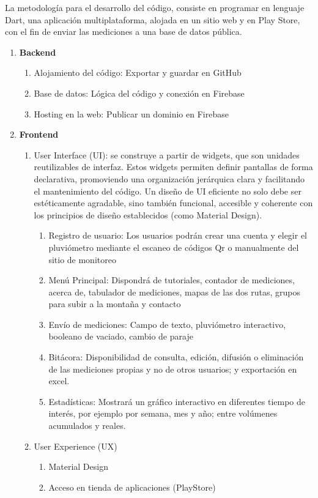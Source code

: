 La metodología para el desarrollo del código, consiste en programar en lenguaje Dart, una aplicación multiplataforma, alojada en un sitio web y en Play Store, con el fin de enviar las mediciones a una base de datos pública.


\begin{enumerate}
  \item \textbf{Backend}
   \begin{enumerate}
    \item Alojamiento del código: Exportar y guardar en GitHub
    \item Base de datos: Lógica del código y conexión en Firebase
    \item Hosting en la web: Publicar un dominio en Firebase
  \end{enumerate}
  \item \textbf{Frontend}
  \begin{enumerate}
    \item User Interface (UI): se construye a partir de widgets, que son unidades reutilizables de interfaz. Estos widgets permiten definir pantallas de forma declarativa, promoviendo una organización jerárquica clara y facilitando el mantenimiento del código. Un diseño de UI eficiente no solo debe ser estéticamente agradable, sino también funcional, accesible y coherente con los principios de diseño establecidos (como Material Design). 
    \begin{enumerate}
    \item Registro de usuario: Los usuarios podrán crear una cuenta y elegir el pluviómetro mediante el escaneo de códigos Qr o manualmente del sitio de monitoreo 
    \item Menú Principal: Dispondrá de tutoriales, contador de mediciones, acerca de, tabulador de mediciones, mapas de las dos rutas, grupos para subir a la montaña y contacto
    \item Envío de mediciones: Campo de texto, pluviómetro interactivo, booleano de vaciado, cambio de paraje
    \item Bitácora: Disponibilidad de consulta, edición, difusión o eliminación de las mediciones propias y no de otros usuarios; y exportación en excel.
    \item Estadísticas: Mostrará un gráfico interactivo en diferentes tiempo de interés, por ejemplo por semana, mes y año; entre volúmenes acumulados y reales.
\end{enumerate}
    \item User Experience (UX)
     \begin{enumerate}
      \item Material Design
      \item Acceso en tienda de aplicaciones (PlayStore)
     \end{enumerate}
  \end{enumerate}

\end{enumerate}











